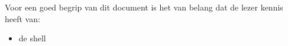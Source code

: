 Voor een goed begrip van dit document is het van belang dat de lezer kennis heeft van:
\begin{itemize}
\item de shell
\end{itemize}

